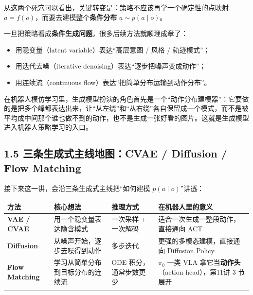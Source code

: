 \documentclass[
  chinese,
]{ctexart}
\providecommand{\tightlist}{%
  \setlength{\itemsep}{0pt}\setlength{\parskip}{0pt}}
\begin{document}
从这两个死穴可以看出，关键转变是：策略不应该再学一个确定性的点映射
\(a = f(o)\)，而要去建模整个\textbf{条件分布} \(a \sim p(a \mid o)\)。

一旦把策略看成\textbf{条件生成问题}，很多后续方法就顺理成章了：

\begin{itemize}
\tightlist
\item
  用隐变量（latent variable）表达``高层意图 / 风格 / 轨迹模式''；
\item
  用迭代去噪（iterative denoising）表达``逐步把噪声变成动作''；
\item
  用连续流（continuous flow）表达``把简单分布运输到动作分布''。
\end{itemize}

在机器人模仿学习里，生成模型扮演的角色首先是一个``动作分布建模器''：它要做的是把多个峰都表达出来，让``从左绕''和``从右绕''各自保留成一个模式，而不是被平均成中间那个谁也做不到的动作，也不是生成一张好看的图片。这就是生成模型进入机器人策略学习的入口。

\subsection{1.5 三条生成式主线地图：CVAE / Diffusion / Flow
Matching}\label{ux4e09ux6761ux751fux6210ux5f0fux4e3bux7ebfux5730ux56fecvae-diffusion-flow-matching}

接下来这一讲，会沿三条生成式主线把``如何建模 \(p(a \mid o)\)''讲透：

\begin{center}
\begin{tabular}{@{}>{\raggedright\arraybackslash}p{} >{\raggedright\arraybackslash}p{} >{\raggedright\arraybackslash}p{} >{\raggedright\arraybackslash}p{}@{}}
\toprule\noalign{}
方法 & 核心想法 & 推理方式 & 在机器人里的意义 \\
\midrule\noalign{}
\textbf{VAE / CVAE} & 用一个隐变量表达隐含模式 & 一次采样 + 一次解码 & 适合一次生成一整段动作，直接通向 ACT \\
\textbf{Diffusion} & 从噪声开始，逐步去噪得到动作 & 多步迭代 & 更强的多模态建模，直接通向 Diffusion Policy \\
\textbf{Flow Matching} & 学习从简单分布到目标分布的连续流 & ODE 积分，通常步数更少 & \(\pi_0\) 一类 VLA 拿它当\textbf{动作头}（action head），第11讲 3 节展开 \\
\bottomrule\noalign{}
\end{tabular}
\end{center}
\end{document}
